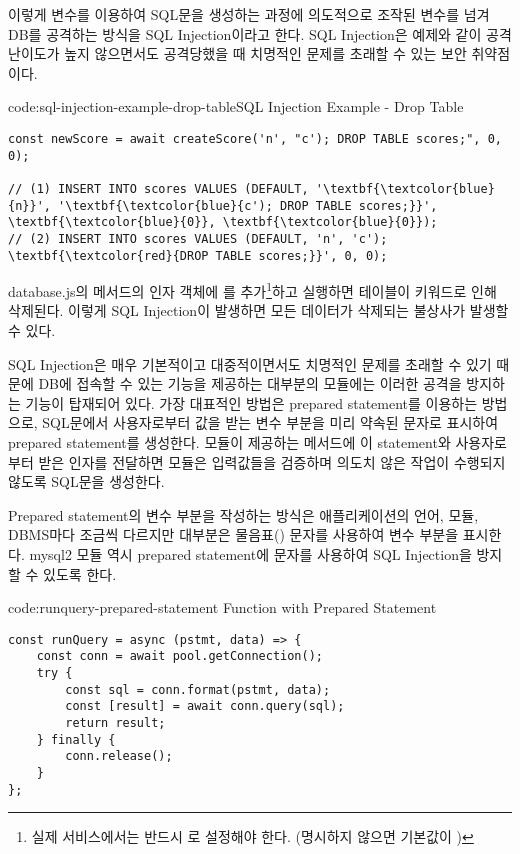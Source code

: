 이렇게 변수를 이용하여 SQL문을 생성하는 과정에 의도적으로 조작된 변수를 넘겨 DB를 공격하는 방식을 SQL Injection이라고 한다. SQL Injection은 예제와 같이 공격 난이도가 높지 않으면서도 공격당했을 때 치명적인 문제를 초래할 수 있는 보안 취약점이다.

\begin{codeenv}{code:sql-injection-example-drop-table}{SQL Injection Example - Drop Table}
\begin{Verbatim}[commandchars=\\\{\}]
const newScore = await createScore('n', "c'); DROP TABLE scores;", 0, 0);

// (1) INSERT INTO scores VALUES (DEFAULT, '\textbf{\textcolor{blue}{n}}', '\textbf{\textcolor{blue}{c'); DROP TABLE scores;}}', \textbf{\textcolor{blue}{0}}, \textbf{\textcolor{blue}{0}});
// (2) INSERT INTO scores VALUES (DEFAULT, 'n', 'c'); \textbf{\textcolor{red}{DROP TABLE scores;}}', 0, 0);
\end{Verbatim}
\end{codeenv}

database.js의  메서드의 인자 객체에 를 추가\footnote{실제 서비스에서는 반드시 로 설정해야 한다. (명시하지 않으면 기본값이 )}하고 \을 실행하면  테이블이  키워드로 인해 삭제된다. 이렇게 SQL Injection이 발생하면 모든 데이터가 삭제되는 불상사가 발생할 수 있다.

SQL Injection은 매우 기본적이고 대중적이면서도 치명적인 문제를 초래할 수 있기 때문에 DB에 접속할 수 있는 기능을 제공하는 대부분의 모듈에는 이러한 공격을 방지하는 기능이 탑재되어 있다. 가장 대표적인 방법은 prepared statement를 이용하는 방법으로, SQL문에서 사용자로부터 값을 받는 변수 부분을 미리 약속된 문자로 표시하여 prepared statement를 생성한다. 모듈이 제공하는 메서드에 이 statement와 사용자로부터 받은 인자를 전달하면 모듈은 입력값들을 검증하며 의도치 않은 작업이 수행되지 않도록 SQL문을 생성한다.

Prepared statement의 변수 부분을 작성하는 방식은 애플리케이션의 언어, 모듈, DBMS마다 조금씩 다르지만 대부분은 물음표() 문자를 사용하여 변수 부분을 표시한다. mysql2 모듈 역시 prepared statement에  문자를 사용하여 SQL Injection을 방지할 수 있도록 한다.

\begin{codeenv}{code:runquery-prepared-statement}{ Function with Prepared Statement}\begin{verbatim}
const runQuery = async (pstmt, data) => {
    const conn = await pool.getConnection();
    try {
        const sql = conn.format(pstmt, data);
        const [result] = await conn.query(sql);
        return result;
    } finally {
        conn.release();
    }
};
\end{verbatim}
\end{codeenv}

